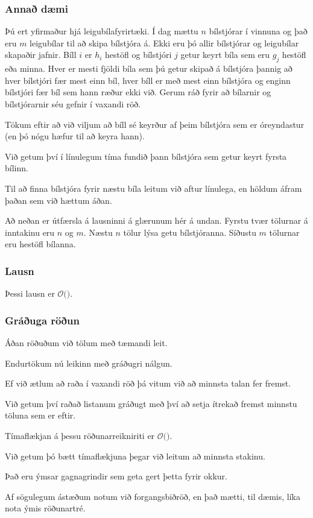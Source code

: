 {
	\frametitle{Annað dæmi}
	{
		\item<1-> 
			Þú ert yfirmaður hjá leigubílafyrirtæki.
			Í dag mættu $n$ bílstjórar í vinnuna og það eru $m$ leigubílar til að skipa bílstjóra á.
			Ekki eru þó allir bílstjórar og leigubílar skapaðir jafnir.
			Bíll $i$ er $h_i$ hestöfl og bílstjóri $j$ getur keyrt bíla sem eru $g_j$ hestöfl eða minna.
			Hver er mesti fjöldi bíla sem þú getur skipað á bílstjóra
				þannig að hver bílstjóri fær mest einn bíl,
				hver bíll er með mest einn bílstjóra og
				enginn bílstjóri fær bíl sem hann ræður ekki við.
			Gerum ráð fyrir að bílarnir og bílstjórarnir séu gefnir í vaxandi röð.
		\item<2-> Tökum eftir að við viljum að bíll sé keyrður af þeim bílstjóra sem er óreyndastur (en þó nógu hæfur til að keyra hann).
		\item<3-> Við getum því í línulegum tíma fundið þann bílstjóra sem getur keyrt fyrsta bílinn.
		\item<4-> Til að finna bílstjóra fyrir næstu bíla leitum við aftur línulega, en höldum áfram þaðan sem við hættum áðan.
	}
}

{
	Að neðan er útfærsla á lausninni á glærunum hér á undan. Fyrstu tvær tölurnar á inntakinu eru $n$ og $m$. 
		Næstu $n$ tölur lýsa getu bílstjóranna.
		Síðustu $m$ tölurnar eru hestöfl bílanna.
}

{
	\frametitle{Lausn}
	{
		\item<1-> Þessi lausn er $\mathcal{O}($\onslide<2->{$n + m$}$)$.
	}
}

{
	\frametitle{Gráðuga röðun}
	{
		\item<1-> Áðan röðuðum við tölum með tæmandi leit.
		\item<2-> Endurtökum nú leikinn með gráðugri nálgun.
		\item<3-> Ef við ætlum að raða í vaxandi röð þá vitum við að minnsta talan fer fremst.
		\item<4-> Við getum því raðað listanum gráðugt með því að setja ítrekað fremst minnstu töluna sem er eftir.
	}
}

{
}

{
	{
		\item<1-> Tímaflækjan á þessu röðunarreikniriti er $\mathcal{O}($\onslide<2->{$n^2$}$)$.
		\item<3-> Við getum þó bætt tímaflækjuna þegar við leitum að minnsta stakinu.
		\item<4-> Það eru ýmsar gagnagrindir sem geta gert þetta fyrir okkur.
		\item<5-> Af sögulegum ástæðum notum við forgangsbiðröð, en það mætti, til dæmis, líka nota ýmis röðunartré.
	}
}

